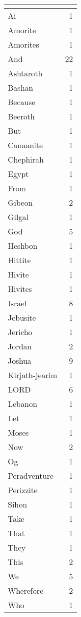 \begin{center}
\begin{longtable}{l|r}
\hline \multicolumn{2}{c}{{ }} \\ \hline
\endfoot 
Ai & 1\\ \hline 
Amorite & 1\\ \hline 
Amorites & 1\\ \hline 
And & 22\\ \hline 
Ashtaroth & 1\\ \hline 
Bashan & 1\\ \hline 
Because & 1\\ \hline 
Beeroth & 1\\ \hline 
But & 1\\ \hline 
Canaanite & 1\\ \hline 
Chephirah & 1\\ \hline 
Egypt & 1\\ \hline 
From & 1\\ \hline 
Gibeon & 2\\ \hline 
Gilgal & 1\\ \hline 
God & 5\\ \hline 
Heshbon & 1\\ \hline 
Hittite & 1\\ \hline 
Hivite & 1\\ \hline 
Hivites & 1\\ \hline 
Israel & 8\\ \hline 
Jebusite & 1\\ \hline 
Jericho & 1\\ \hline 
Jordan & 2\\ \hline 
Joshua & 9\\ \hline 
Kirjath-jearim & 1\\ \hline 
LORD & 6\\ \hline 
Lebanon & 1\\ \hline 
Let & 1\\ \hline 
Moses & 1\\ \hline 
Now & 2\\ \hline 
Og & 1\\ \hline 
Peradventure & 1\\ \hline 
Perizzite & 1\\ \hline 
Sihon & 1\\ \hline 
Take & 1\\ \hline 
That & 1\\ \hline 
They & 1\\ \hline 
This & 2\\ \hline 
We & 5\\ \hline 
Wherefore & 2\\ \hline 
Who & 1\\ \hline 

\end{longtable}
\end{center}
